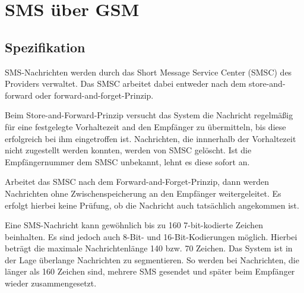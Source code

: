 \documentclass[german,12pt,a4paper]{article}
\begin{document}
\section{SMS über GSM} %
\subsection{Spezifikation}
SMS-Nachrichten werden durch das Short Message Service Center (SMSC) des 
Providers verwaltet. Das SMSC arbeitet dabei entweder nach dem store-and-forward oder 
forward-and-forget-Prinzip. 

Beim Store-and-Forward-Prinzip versucht das System 
die Nachricht regelmäßig für eine festgelegte Vorhaltezeit and den Empfänger 
zu übermitteln, bis diese erfolgreich bei ihm eingetroffen ist. Nachrichten, die innnerhalb 
der Vorhaltezeit nicht zugestellt werden konnten, werden von SMSC gelöscht. 
Ist die Empfängernummer dem SMSC unbekannt, lehnt es diese sofort an.

Arbeitet das SMSC nach dem Forward-and-Forget-Prinzip, dann werden Nachrichten ohne 
Zwischenspeicherung an den Empfänger weitergeleitet. Es erfolgt hierbei keine Prüfung, 
ob die Nachricht auch tatsächlich angekommen ist.

Eine SMS-Nachricht kann gewöhnlich bis zu 160 7-bit-kodierte Zeichen beinhalten. 
Es sind jedoch auch 8-Bit- und 16-Bit-Kodierungen möglich. Hierbei beträgt die 
maximale Nachrichtenlänge 140 bzw. 70 Zeichen. Das System ist in der Lage überlange 
Nachrichten zu segmentieren. So werden bei Nachrichten, die länger als 160 Zeichen 
sind, mehrere SMS gesendet und später beim Empfänger wieder zusammengesetzt.
\end{document}
